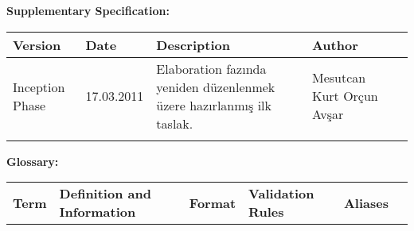 \documentclass[12pt,a4paper]{report}
\begin{document}


\newpage
{
\bf
Supplementary Specification: \\[1cm]
}
\begin{tabular}{ |p{2.5cm} | p{2cm} | p{7cm} | p{2.7cm} | }

\hline
\bf
Version
&
\bf
Date
&
\bf
Description
&
\bf
Author \\
\hline

Inception Phase
&
17.03.2011
&
Elaboration fazında yeniden düzenlenmek üzere hazırlanmış ilk taslak.
&
Mesutcan Kurt
Orçun Avşar \\
\hline

&

&

&

&

\hline

\end{tabular}

\newpage

{
\bf
Glossary:  \\[1cm]
}
\begin{tabular}{ |p{2cm} | p{6cm} | p{2.3cm} | p{3cm} | p{2cm} |}
\hline
\bf
Term
&
\bf
Definition and Information
&
\bf
Format
&
\bf
Validation Rules
&
\bf
Aliases
&
\hline


\end{tabular}
\end{document}
